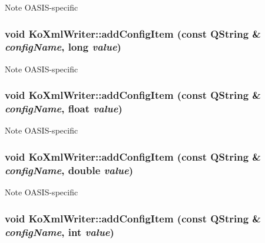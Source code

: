 \label{classKoXmlWriter_a517c0ff99e13b5f20df48b9b49bffcca}
\begin{DoxyNote}{Note}
OASIS-\/specific 
\end{DoxyNote}
\hypertarget{classKoXmlWriter_a96dd3ec071587e931296ce5e2b18c1e3}{
\subsubsection[{addConfigItem}]{\setlength{\rightskip}{0pt plus 5cm}void KoXmlWriter::addConfigItem (const QString \& {\em configName}, \/  long {\em value})}}
\label{classKoXmlWriter_a96dd3ec071587e931296ce5e2b18c1e3}
\begin{DoxyNote}{Note}
OASIS-\/specific 
\end{DoxyNote}
\hypertarget{classKoXmlWriter_a3f5fa5e7f6283055cd09c94c8f67206f}{
\subsubsection[{addConfigItem}]{\setlength{\rightskip}{0pt plus 5cm}void KoXmlWriter::addConfigItem (const QString \& {\em configName}, \/  float {\em value})}}
\label{classKoXmlWriter_a3f5fa5e7f6283055cd09c94c8f67206f}
\begin{DoxyNote}{Note}
OASIS-\/specific 
\end{DoxyNote}
\hypertarget{classKoXmlWriter_a3b08df454948731cdf29026298798540}{
\subsubsection[{addConfigItem}]{\setlength{\rightskip}{0pt plus 5cm}void KoXmlWriter::addConfigItem (const QString \& {\em configName}, \/  double {\em value})}}
\label{classKoXmlWriter_a3b08df454948731cdf29026298798540}
\begin{DoxyNote}{Note}
OASIS-\/specific 
\end{DoxyNote}
\hypertarget{classKoXmlWriter_a14522a8ea1c3b25e299319653ba9af9e}{
\subsubsection[{addConfigItem}]{\setlength{\rightskip}{0pt plus 5cm}void KoXmlWriter::addConfigItem (const QString \& {\em configName}, \/  int {\em value})}}
